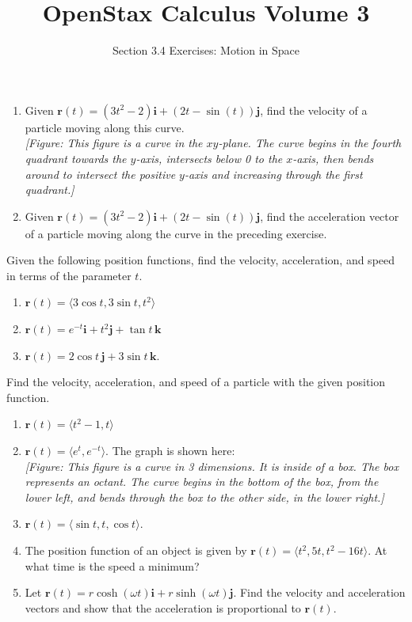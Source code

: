 \documentclass{exercises}
\title{OpenStax Calculus Volume 3}
\subtitle{Section 3.4 Exercises: Motion in Space}
\author{}
\date{}
\begin{document}
\maketitle

\begin{enumerate}[start=1]
\item Given $\mathbf{r}(t)=(3t^{2}-2)\mathbf{i}+(2t-\sin(t))\mathbf{j}$, find the velocity of a particle moving along this curve. \\ \textit{[Figure: This figure is a curve in the $xy$-plane. The curve begins in the fourth quadrant towards the $y$-axis, intersects below 0 to the $x$-axis, then bends around to intersect the positive $y$-axis and increasing through the first quadrant.]}
\item Given $\mathbf{r}(t)=(3t^{2}-2)\mathbf{i}+(2t-\sin(t))\mathbf{j}$, find the acceleration vector of a particle moving along the curve in the preceding exercise.
\end{enumerate}

Given the following position functions, find the velocity, acceleration, and speed in terms of the parameter $t$.

\begin{enumerate}[resume]
\item $\mathbf{r}(t)=\langle3\cos t,3\sin t,t^{2}\rangle$
\item $\mathbf{r}(t)=e^{-t}\mathbf{i}+t^{2}\mathbf{j}+\tan t\,\mathbf{k}$
\item $\mathbf{r}(t)=2\cos t\,\mathbf{j}+3\sin t\,\mathbf{k}$.
\end{enumerate}

Find the velocity, acceleration, and speed of a particle with the given position function.

\begin{enumerate}[resume]
\item $\mathbf{r}(t)=\langle t^{2}-1,t\rangle$
\item $\mathbf{r}(t)=\langle e^{t},e^{-t}\rangle$. The graph is shown here: \\ \textit{[Figure: This figure is a curve in 3 dimensions. It is inside of a box. The box represents an octant. The curve begins in the bottom of the box, from the lower left, and bends through the box to the other side, in the lower right.]}
\item $\mathbf{r}(t)=\langle \sin t,t,\cos t\rangle$.
\item The position function of an object is given by $\mathbf{r}(t)=\langle t^{2},5t,t^{2}-16t\rangle$. At what time is the speed a minimum?
\item Let $\mathbf{r}(t)=r\cosh(\omega t)\mathbf{i}+r\sinh(\omega t)\mathbf{j}$. Find the velocity and acceleration vectors and show that the acceleration is proportional to $\mathbf{r}(t)$.
\end{enumerate}
\end{document}

